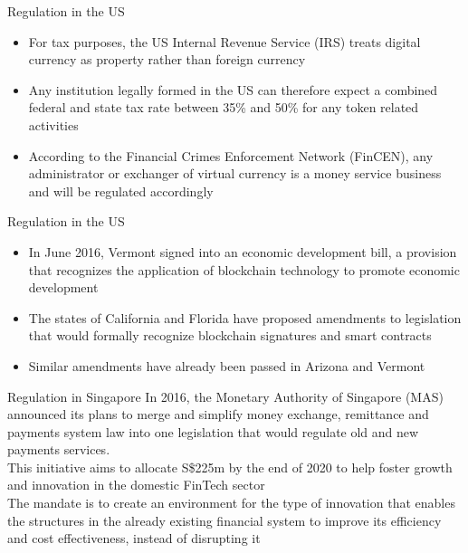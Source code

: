 \documentclass[10pt]{beamer}
\begin{document}

\begin{frame}{Regulation in the US}
	\begin{itemize}
		\item For tax purposes, the US Internal Revenue Service (IRS) treats digital currency as property rather than foreign currency
		\item Any institution legally formed in the US can therefore expect a combined federal and state tax rate between 35\% and 50\% for any token related activities
		\item According to the Financial Crimes Enforcement Network (FinCEN), any administrator or exchanger of virtual currency is a money service business and will  be regulated accordingly
	\end{itemize}
\end{frame}


\begin{frame}{Regulation in the US}
	\begin{itemize}
		\item In June 2016, Vermont signed into an economic development bill, a provision that recognizes the application of blockchain technology to  promote economic development
		\item The states of California and Florida have proposed amendments to legislation that would formally recognize blockchain signatures and smart contracts
		\item Similar amendments have already been passed in Arizona and Vermont
	\end{itemize}
\end{frame}


\begin{frame}{Regulation in Singapore}
	In 2016, the Monetary Authority of Singapore (MAS) announced its plans to merge and simplify money exchange, remittance and payments system law into one legislation that would regulate old and new payments services. \\ \vspace{3mm}
	This initiative aims to allocate S\$225m by the end of 2020 to help foster growth and innovation in the domestic FinTech sector\\ \vspace{3mm}
	The mandate is to create an environment for the type of innovation that enables the structures in the already existing financial system to improve its efficiency and cost effectiveness, instead of disrupting it
\end{frame}
\end{document}
